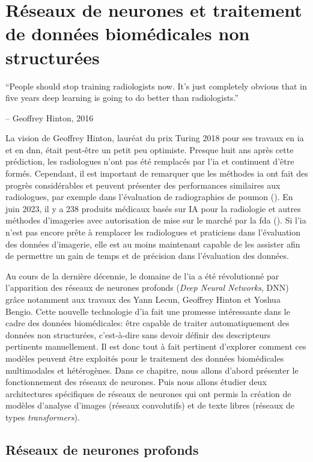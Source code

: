 \chapter{Réseaux de neurones et traitement de données biomédicales non structurées}

\epigraph{\LARGE{``People should stop training radiologists now. It's just completely obvious that in five years deep learning is going to do better than radiologists.''}}{\LARGE{-- Geoffrey Hinton, 2016}}


La vision de Geoffrey Hinton, lauréat du prix Turing 2018 pour ses travaux en \gls{ia} et en \gls{dnn}, était peut-être un petit peu optimiste. Presque huit ans après cette prédiction, les radiologues n'ont pas été remplacés par l'\gls{ia} et continuent d'être formés. Cependant, il est important de remarquer que les méthodes \gls{ia} ont fait des progrès considérables et peuvent présenter des performances similaires aux radiologues, par exemple dans l'évaluation de radiographies de poumon (\cite{frauke_rudolf_ai_2023}). En juin 2023, il y a 238 produits médicaux basés sur IA pour la radiologie et autres méthodes d'imageries avec autorisation de mise sur le marché par la \gls{fda} (\cite{keith_j_dreyer_acr_2023}). Si l'\gls{ia} n'est pas encore prête à remplacer les radiologues et praticiens dans l'évaluation des données d'imagerie, elle est au moins maintenant capable de les assister afin de permettre un gain de temps et de précision dans l'évaluation des données.


Au cours de la dernière décennie, le domaine de l'\gls{ia} a été révolutionné par l'apparition des réseaux de neurones profonds (\textit{Deep Neural Networks}, DNN) grâce notamment aux travaux des Yann Lecun, Geoffrey Hinton et Yoshua Bengio. Cette nouvelle technologie d'\gls{ia} fait une promesse intéressante dans le cadre des données biomédicales: être capable de traiter automatiquement des données non structurées, c’est-à-dire sans devoir définir des descripteurs pertinents manuellement. Il est donc tout à fait pertinent d'explorer comment ces modèles peuvent être exploités pour le traitement des données biomédicales multimodales et hétérogènes. Dans ce chapitre, nous allons d'abord présenter le fonctionnement des réseaux de neurones. Puis nous allons étudier deux architectures spécifiques de réseaux de neurones qui ont permis la création de modèles d'analyse d'images (réseaux convolutifs) et de texte libres (réseaux de types \textit{transformers}).

\section{Réseaux de neurones profonds}

